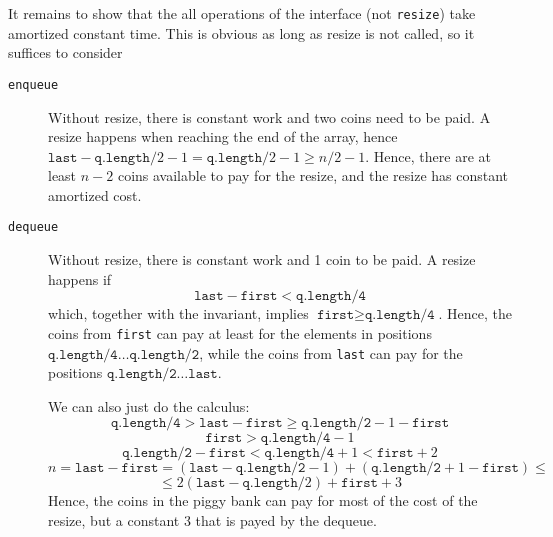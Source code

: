 \documentclass{tufte-handout}
\begin{document}
It remains to show that the all operations of the interface (not \texttt{resize}) take amortized constant time.
This is obvious as long as resize is not called, so it suffices to consider
\begin{description}
\item[\texttt{enqueue}]
  Without resize, there is constant work and two coins need to be paid.
  A resize happens when reaching the end of the array, hence $\texttt{last} - \texttt{q.length}/2-1 = \texttt{q.length}/2-1 \ge n/2 -1$.
  Hence, there are at least $n-2$ coins available to pay for the resize, and the resize has constant amortized cost.
\item[\texttt{dequeue}]
  Without resize, there is constant work and 1 coin to be paid.
  A resize happens if
  \[ \texttt{last} - \texttt{first} < \texttt{q.length/4} \]
  which, together with the invariant, implies $\texttt{first} \ge \texttt{q.length/4}$.
  Hence, the coins from \texttt{first} can pay at least for the elements in positions 
  $\texttt{q.length/4}\ldots \texttt{q.length/2}$, while the coins from \texttt{last} can pay for the positions   $\texttt{q.length/2}\ldots \texttt{last}$.

  \pagebreak
  We can also just do the calculus:
  \[ \texttt{q.length/4} > \texttt{last} - \texttt{first} \ge \texttt{q.length/2} -1 - \texttt{first} \]
  \[  \texttt{first} >  \texttt{q.length/4} -1 \]
  \[  \texttt{q.length/2} - \texttt{first}  <  \texttt{q.length/4} + 1 < \texttt{first} +2 \]
  \[ n = \texttt{last} - \texttt{first} = (\texttt{last} -\texttt{q.length/2} -1) + (\texttt{q.length/2} +1 - \texttt{first}) \le\]
  \[\le  2(\texttt{last} - \texttt{q.length}/2) + \texttt{first}  +3 \]
  Hence, the coins in the piggy bank can pay for most of the cost of the resize, but a constant 3 that is payed by the dequeue.
\end{description}
\end{document}
